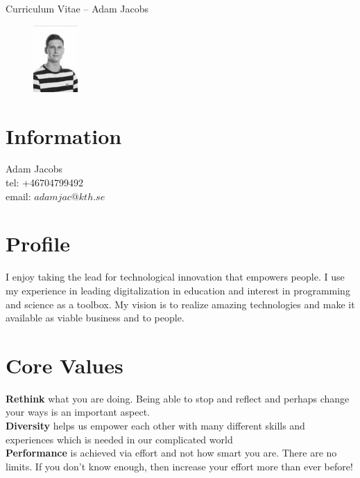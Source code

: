 \documentclass[margin,line,a4paper]{resume}
\begin{document}
{\sc \Large Curriculum Vitae -- Adam Jacobs}
\begin{resume}
    \vspace{0.01cm}
    \begin{figure}
        \vspace{-1cm}
       \begin{center}
       \includegraphics[width=0.15\textwidth]{adamjacobs}
       \end{center}
        \vspace{-1cm}
    \end{figure}
    
    \section{\mysidestyle Information}%
    Adam Jacobs \\
    tel: +46704799492 \\
    email: $adamjac@kth.se$
    \href{} \\

\section{\mysidestyle Profile}\vspace{1mm}
I enjoy taking the lead for technological innovation that empowers people. I use my experience in leading digitalization in education and interest in programming and science as a toolbox. My vision is to realize amazing technologies and make it available as viable business and to people.

\section{\mysidestyle Core Values}\vspace{1mm}
    \textbf{Rethink} what you are doing. Being able to stop and reflect and perhaps change your ways is an important aspect.
    \\
     \textbf{Diversity} helps us empower each other with many different skills and experiences which is needed in our complicated world
    \\
    \textbf{Performance} is achieved via effort and not how smart you are. There are no limits. If you don't know enough, then increase your effort more than ever before!


\end{resume}
\end{document}
